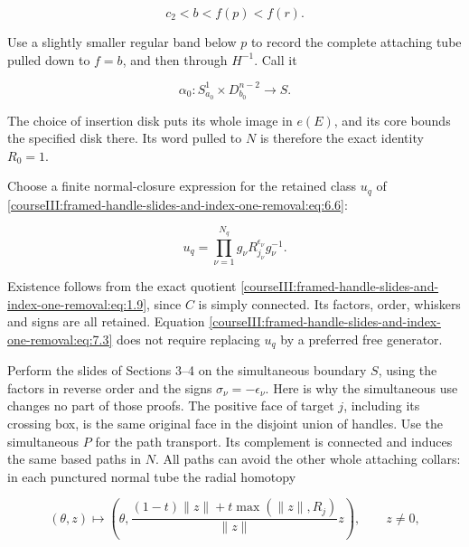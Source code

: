 \begin{equation}
c_2<b<f(p)<f(r).
 \label{courseIII:framed-handle-slides-and-index-one-removal:eq:7.1}
\end{equation}

Use a slightly smaller regular band below \(p\) to record the complete attaching tube pulled down to \(f=b\), and then through \(H^{-1}\). Call it

\begin{equation}
\alpha_0:S^1_{a_0}\times D^{n-2}_{b_0}\longrightarrow S.
 \label{courseIII:framed-handle-slides-and-index-one-removal:eq:7.2}
\end{equation}

The choice of insertion disk puts its whole image in \(e(E)\), and its core bounds the specified disk there. Its word pulled to \(N\) is therefore the exact identity \(R_0=1\).

Choose a finite normal-closure expression for the retained class \(u_q\) of \eqref{courseIII:framed-handle-slides-and-index-one-removal:eq:6.6}:

\begin{equation}
u_q=\prod_{\nu=1}^{N_q}
           g_\nu R_{j_\nu}^{\epsilon_\nu}g_\nu^{-1}.
 \label{courseIII:framed-handle-slides-and-index-one-removal:eq:7.3}
\end{equation}

Existence follows from the exact quotient \eqref{courseIII:framed-handle-slides-and-index-one-removal:eq:1.9}, since \(C\) is simply connected. Its factors, order, whiskers and signs are all retained. Equation \eqref{courseIII:framed-handle-slides-and-index-one-removal:eq:7.3} does not require replacing \(u_q\) by a preferred free generator.

Perform the slides of Sections 3--4 on the simultaneous boundary \(S\), using the factors in reverse order and the signs \(\sigma_\nu=-\epsilon_\nu\). Here is why the simultaneous use changes no part of those proofs. The positive face of target \(j\), including its crossing box, is the same original face in the disjoint union of handles. Use the simultaneous \(P\) for the path transport. Its complement is connected and induces the same based paths in \(N\). All paths can avoid the other whole attaching collars: in each punctured normal tube the radial homotopy

\begin{equation}
(\theta,z)\longmapsto
 \left(\theta,
     \frac{(1-t)\|z\|+t\max(\|z\|,R_j)}{\|z\|}z\right),
 \qquad z\ne0,
 \label{courseIII:framed-handle-slides-and-index-one-removal:eq:7.4}
\end{equation}

